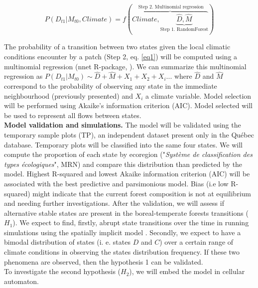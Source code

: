 \begin{equation}
	P(D_{t1}|M_{t0}, Climate) = f(\overbrace{Climate, \underbrace{\hat{D}, \hat{M}}_\text{Step 1. RandomForest}}^\text{ Step 2. Multinomial regression})
\label{eq1}
\end{equation}

The probability of a transition between two states given the local climatic
conditions encounter by a patch (Step 2, eq. \ref{eq1}) will be computed using a multinomial
regression (nnet R-package, \cite{Venables2002}). We can summarize this
multinomial regression as $P(D_{t1}|M_{t0}) \sim \hat{D} + \hat{M} +
X_1+X_2+X_i... $ where $\hat{D}$ and $\hat{M}$ correspond to the probability
of observing any state in the immediate neighbourhood (previously presented)
and $X_i$ a climate variable. Model selection will be performed using Akaike's
information criterion (AIC). Model selected will be used to represent all
flows between states.   \\

\textbf{Model validation and simulations.}  The model will be validated using
the temporary sample plots (TP), an independent dataset present only in the
Québec database. Temporary plots will be classified into the same four states.
We will compute the proportion of each state by ecoregion ("\textit{Système de
classification des types écologiques}", MRN) and compare this distribution
than predicted by the model.  Highest R-squared and lowest Akaike information
criterion (AIC) will be associated with the best predictive and parsimonious
model. Bias (i.e low R-squared) might indicate that the current forest
composition is not at equilibrium and needing further investigations. After
the validation, we will assess if alternative stable states are present in the
boreal-temperate forests transitions ($H_1$).  We expect to find, firstly,
abrupt state transitions over the time in running simulations using the
spatially implicit model . Secondly, we expect to have a bimodal distribution
of states (i. e. states $D$ and $C$) over a certain range of climate
conditions in observing the states distribution frequency. If these two
phenomena are observed, then the hypothesis 1 can be validated. \\


To investigate the second hypothesis ($H_2$), we will embed the model in cellular
automaton. 

